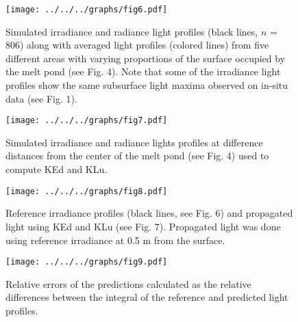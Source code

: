 \documentclass[12pt,a4paper]{scrartcl}
\begin{document}
\clearpage
\newpage

\begin{figure}[ht]
	\centering
	\texttt{[image: ../../../graphs/fig6.pdf]}
	\caption{Simulated irradiance and radiance light profiles (black lines, $n$ = 806) along with averaged light profiles (colored lines) from five different areas with varying proportions of the surface occupied by the melt pond (see Fig. 4). Note that some of the irradiance light profiles show the same subsurface light maxima observed on in-situ data (see Fig. 1).}
\end{figure}

\clearpage
\newpage

\begin{figure}[ht]
	\centering
	\texttt{[image: ../../../graphs/fig7.pdf]}
	\caption{Simulated irradiance and radiance lights profiles at difference distances from the center of the melt pond (see Fig. 4) used to compute KEd and KLu.}
\end{figure}

\clearpage
\newpage

\begin{figure}[ht]
	\centering
	\texttt{[image: ../../../graphs/fig8.pdf]}
	\caption{Reference irradiance profiles (black lines, see Fig. 6) and propagated light using KEd and KLu (see Fig. 7). Propagated light was done using reference irradiance at 0.5 m from the surface.}
\end{figure}

\clearpage
\newpage

\begin{figure}[ht]
	\centering
	\texttt{[image: ../../../graphs/fig9.pdf]}
	\caption{Relative errors of the predictions calculated as the relative differences between the integral of the reference and predicted light profiles.}
\end{figure}
\end{document}
